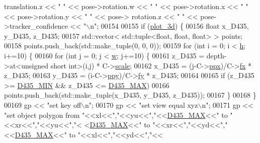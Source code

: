 \begin{DoxyCode}
{      translation.z << \textcolor{stringliteral}{" "} << pose->rotation.w << \textcolor{stringliteral}{" "} << pose->rotation.x << \textcolor{stringliteral}{" "} << pose->rotation.y << \textcolor{stringliteral}{" "} << pose->
      rotation.z << \textcolor{stringliteral}{" "} << pose->tracker\_confidence << \textcolor{stringliteral}{"\(\backslash\)n"};
00154 
00155         \textcolor{keywordflow}{if} (\hyperlink{Logging_8hpp_a90bc243756c79ffb6d9c4a4ea99c41c2}{plot\_3d}) \{
00156             \textcolor{keywordtype}{float} x\_D435, y\_D435, z\_D435;
00157             std::vector< std::tuple<float, float, float> > points;
00158             points.push\_back(std::make\_tuple(0, 0, 0));
00159             \textcolor{keywordflow}{for} (\textcolor{keywordtype}{int} i = 0; i < \hyperlink{Camera_8hpp_a3f40fea9b1040e381f08ddd4b026765d}{h}; i+=10) \{
00160                 \textcolor{keywordflow}{for} (\textcolor{keywordtype}{int} j = 0; j < \hyperlink{Camera_8hpp_a66326676d44c838441a4dc39c85f599b}{w}; j+=10) \{
00161                     z\_D435 = depth->at<\textcolor{keywordtype}{unsigned} \textcolor{keywordtype}{short} \textcolor{keywordtype}{int}>(i,j) * C->\hyperlink{classCamera_a50152f7c8f2ce7601dd6086c90b3a65c}{scale};
00162                     x\_D435 = (j-C->\hyperlink{classCamera_aa646a2de04e9ad37395dcf3c4a171abe}{ppx})/C->\hyperlink{classCamera_a4f5e789525c1c9306028c080922582e2}{fx} * z\_D435;
00163                     y\_D435 = (i-C->\hyperlink{classCamera_a0e51f157264b9c9e18feb584c5a6c606}{ppy})/C->\hyperlink{classCamera_a1472650e23f3df5f23dda7f94537e889}{fy} * z\_D435;
00164 
00165                     if (z\_D435 >= \hyperlink{Camera_8hpp_a8c14b0a57a757fa1eca7b19c2d0bd110}{D435\_MIN} && z\_D435 <= \hyperlink{Camera_8hpp_a525f4d6ba7971b5fc8f0bc55ea826762}{D435\_MAX})
00166                         points.push\_back(std::make\_tuple(x\_D435, y\_D435, z\_D435));
00167                 \}
00168             \}
00169             gp << \textcolor{stringliteral}{"set key off\(\backslash\)n"};
00170             gp << \textcolor{stringliteral}{"set view equal xyz\(\backslash\)n"};
00171             gp << \textcolor{stringliteral}{"set object polygon from "}<<xl<<\textcolor{stringliteral}{","}<<yu<<\textcolor{stringliteral}{","}<<\hyperlink{Camera_8hpp_a525f4d6ba7971b5fc8f0bc55ea826762}{D435\_MAX}<<\textcolor{stringliteral}{" to "}<<xr<<\textcolor{stringliteral}{","}<<yu<<\textcolor{stringliteral}{","}<
      <\hyperlink{Camera_8hpp_a525f4d6ba7971b5fc8f0bc55ea826762}{D435\_MAX}<<\textcolor{stringliteral}{" to "}<<xr<<\textcolor{stringliteral}{","}<<yd<<\textcolor{stringliteral}{","}<<\hyperlink{Camera_8hpp_a525f4d6ba7971b5fc8f0bc55ea826762}{D435\_MAX}<<\textcolor{stringliteral}{" to "}<<xl<<\textcolor{stringliteral}{","}<<yd<<\textcolor{stringliteral}{","}<<
}
\end{DoxyCode}

